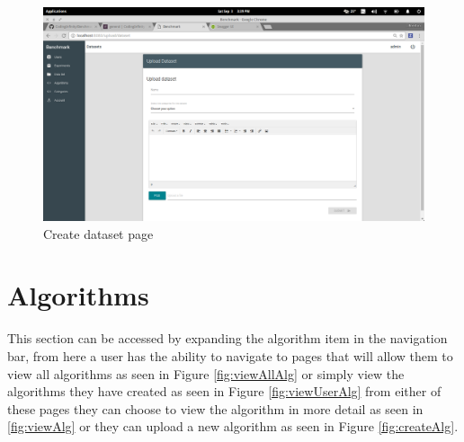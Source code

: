 \documentclass[11pt,a4paper]{article}
\begin{document}
\begin{figure}[H]
	\begin{center}
		\includegraphics[scale=0.3]{../Images/User Manual/Upload Dataset.png}
		\caption{Create dataset page}
		\label{fig:createData}
	\end{center}  
\end{figure}

\section{Algorithms}
This section can be accessed by expanding the algorithm item in the navigation bar, from
here a user has the ability to navigate to pages that will allow them to view all algorithms
as seen in Figure \ref{fig:viewAllAlg} or simply view the algorithms they have
created as seen in Figure \ref{fig:viewUserAlg} from either of these pages they can choose
to view the algorithm in more detail as seen in \ref{fig:viewAlg} or they can upload a new
algorithm as seen in Figure \ref {fig:createAlg}.
\end{document}
